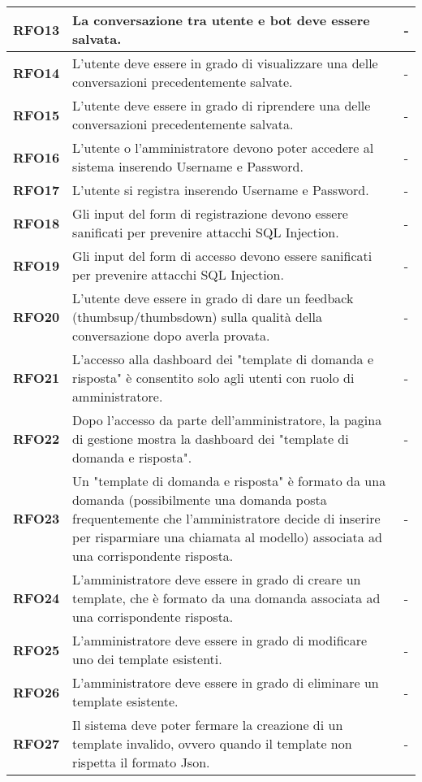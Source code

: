 \begin{longtable}{|>{\centering\arraybackslash}m{}|>{\centering\arraybackslash}m{}|>{\centering\arraybackslash}m{}|}
    \hline
    \textbf{RFO13} & La conversazione tra utente e bot deve essere salvata. & - \\
    \hline
    \textbf{RFO14} & L'utente deve essere in grado di visualizzare una delle conversazioni precedentemente salvate. & - \\
    \hline
    \textbf{RFO15} & L'utente deve essere in grado di riprendere una delle conversazioni precedentemente salvata. & - \\
    \hline
    \textbf{RFO16} & L'utente o l'amministratore devono poter accedere al sistema inserendo Username e Password. & - \\
    \hline
    \textbf{RFO17} & L'utente si registra inserendo Username e Password. & - \\
    \hline
    \textbf{RFO18} & Gli input del form di registrazione devono essere sanificati per prevenire attacchi SQL Injection. & - \\
    \hline
    \textbf{RFO19} & Gli input del form di accesso devono essere sanificati per prevenire attacchi SQL Injection. & - \\
    \hline
    \textbf{RFO20} & L'utente deve essere in grado di dare un feedback (thumbsup/thumbsdown) sulla qualità della conversazione dopo averla provata. & - \\
    \hline
    \textbf{RFO21} & L’accesso alla dashboard dei "template di domanda e risposta" è consentito solo agli utenti con ruolo di amministratore. & - \\
    \hline
    \textbf{RFO22} & Dopo l’accesso da parte dell'amministratore, la pagina di gestione mostra la dashboard dei "template di domanda e risposta". & - \\
    \hline
    \textbf{RFO23} & Un "template di domanda e risposta" è formato da una domanda (possibilmente una domanda posta frequentemente che l'amministratore decide di inserire per risparmiare una chiamata al modello) associata ad una corrispondente risposta. & - \\
    \hline
    \textbf{RFO24} & L'amministratore deve essere in grado di creare un template, che è formato da una domanda associata ad una corrispondente risposta. & - \\
    \hline
    \textbf{RFO25} & L'amministratore deve essere in grado di modificare uno dei template esistenti. & - \\
    \hline
    \textbf{RFO26} & L'amministratore deve essere in grado di eliminare un template esistente. & - \\
    \hline
    \textbf{RFO27} & Il sistema deve poter fermare la creazione di un template invalido, ovvero quando il template non rispetta il formato Json. & - \\

\end{longtable}
